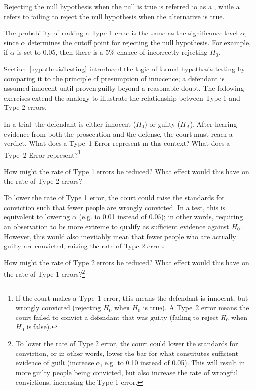 \begin{spacing}{1.5}
Rejecting the null hypothesis when the null is true is referred to as a , while a  refers to failing to reject the null hypothesis when the alternative is true. 

The probability of making a Type 1 error is the same as the significance level $\alpha$, since $\alpha$ determines the cutoff point for rejecting the null hypothesis. For example, if $\alpha$ is set to 0.05, then there is a 5\% chance of incorrectly rejecting $H_0$. 

Section~\ref{hypothesisTesting} introduced the logic of formal hypothesis testing by comparing it to the principle of presumption of innocence; a defendant is assumed innocent until proven guilty beyond a reasonable doubt. The following exercises extend the analogy to illustrate the relationship between Type 1 and Type 2 errors.

\begin{exercise} \label{whatAreTheErrorTypesInUSCourts}
	In a trial, the defendant is either innocent ($H_0$) or guilty ($H_A$). After hearing evidence from both the prosecution and the defense, the court must reach a verdict. What does a Type~1 Error represent in this context? What does a Type~2 Error represent?\footnote{If the court makes a Type~1 error, this means the defendant is innocent, but wrongly convicted (rejecting $H_0$ when $H_0$ is true). A Type~2 error means the court failed to convict a defendant that was guilty (failing to reject $H_0$ when $H_0$ is false).}
\end{exercise}

\begin{example}{How might the rate of Type 1 errors be reduced? What effect would this have on the rate of Type 2 errors?}
	
	To lower the rate of Type 1 error, the court could raise the standards for conviction such that fewer people are wrongly convicted. In a test, this is equivalent to lowering $\alpha$ (e.g. to 0.01 instead of 0.05); in other words, requiring an observation to be more extreme to qualify as sufficient evidence against $H_0$. However, this would also inevitably mean that fewer people who are actually guilty are convicted, raising the rate of Type 2 errors.
\end{example}

\begin{exercise} \label{howToReduceType2ErrorsInUSCourts}
	How might the rate of Type 2 errors be reduced? What effect would this have on the rate of Type 1 errors?\footnote{To lower the rate of Type 2 error, the court could lower the standards for conviction, or in other words, lower the bar for what constitutes sufficient evidence of guilt (increase $\alpha$, e.g. to 0.10 instead of 0.05). This will result in more guilty people being convicted, but also increase the rate of wrongful convictions, increasing the Type 1 error.}
\end{exercise}


\end{spacing}
